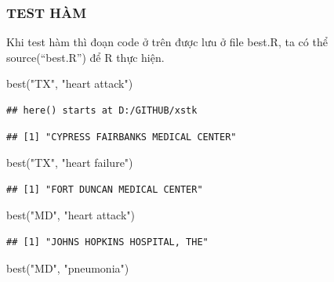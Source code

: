 \documentclass[
]{book}
\newenvironment{Shaded}{\begin{snugshade}}{\end{snugshade}}
\newcommand{\FunctionTok}[1]{\textcolor[rgb]{0.00,0.00,0.00}{#1}}
\newcommand{\NormalTok}[1]{#1}
\newcommand{\StringTok}[1]{\textcolor[rgb]{0.31,0.60,0.02}{#1}}
\theoremstyle{definition}
\theoremstyle{definition}
\theoremstyle{definition}
\theoremstyle{definition}
\theoremstyle{remark}
\begin{document}
\hypertarget{test-huxe0m}{%
\subsubsection{TEST HÀM}\label{test-huxe0m}}

Khi test hàm thì đoạn code ở trên được lưu ở file best.R, ta có thể source(``best.R'') để R thực hiện.

\begin{Shaded}
\begin{Highlighting}[]
\FunctionTok{best}\NormalTok{(}\StringTok{"TX"}\NormalTok{, }\StringTok{"heart attack"}\NormalTok{)}
\end{Highlighting}
\end{Shaded}

\begin{verbatim}
## here() starts at D:/GITHUB/xstk
\end{verbatim}

\begin{verbatim}
## [1] "CYPRESS FAIRBANKS MEDICAL CENTER"
\end{verbatim}

\begin{Shaded}
\begin{Highlighting}[]
\FunctionTok{best}\NormalTok{(}\StringTok{"TX"}\NormalTok{, }\StringTok{"heart failure"}\NormalTok{)}
\end{Highlighting}
\end{Shaded}

\begin{verbatim}
## [1] "FORT DUNCAN MEDICAL CENTER"
\end{verbatim}

\begin{Shaded}
\begin{Highlighting}[]
\FunctionTok{best}\NormalTok{(}\StringTok{"MD"}\NormalTok{, }\StringTok{"heart attack"}\NormalTok{)}
\end{Highlighting}
\end{Shaded}

\begin{verbatim}
## [1] "JOHNS HOPKINS HOSPITAL, THE"
\end{verbatim}

\begin{Shaded}
\begin{Highlighting}[]
\FunctionTok{best}\NormalTok{(}\StringTok{"MD"}\NormalTok{, }\StringTok{"pneumonia"}\NormalTok{)}
\end{Highlighting}
\end{Shaded}
\end{document}
